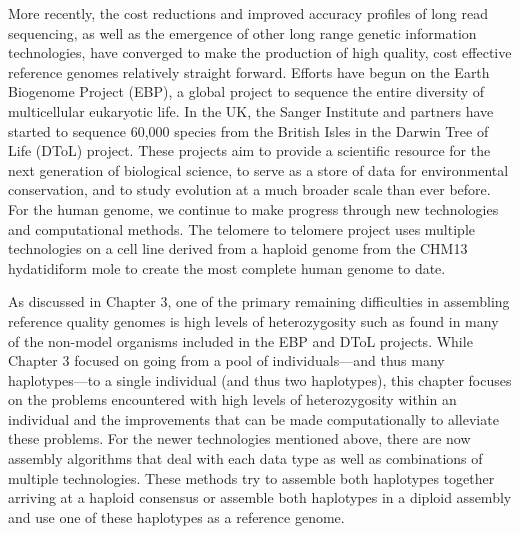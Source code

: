 \par{
More recently, the cost reductions and improved accuracy profiles\cite{ccs}\cite{HIFI} of long read sequencing\cite{pacbio}\cite{oxford},
as well as the emergence of other long range genetic information technologies\cite{10xlinked}\cite{HiC}\cite{bionano}, 
have converged to make the production of high quality, cost effective reference genomes relatively straight forward. Efforts have begun on the Earth Biogenome Project (EBP)\cite{EBGP}, a global project to sequence the entire diversity of multicellular eukaryotic life. In the UK, the Sanger Institute and partners have started to sequence 60,000 species from the British Isles in the Darwin Tree of Life (DToL) project. These projects aim to provide a scientific resource for the next generation of biological science, to serve as a store of data for environmental conservation, and to study evolution at a much broader scale than ever before. For the human genome, we continue to make progress through new technologies and computational methods\cite{Wenger2019}\cite{tobias1}\cite{eichler1}. The telomere to telomere project uses multiple technologies on a cell line derived from a haploid genome from the CHM13 hydatidiform mole to create the most complete human genome to date\cite{T2T2}\cite{T2T1}.
} 

\par{
As discussed in Chapter 3, one of the primary remaining difficulties in assembling reference quality genomes is high levels of heterozygosity such as found in many of the non-model organisms included in the EBP and DToL projects. While Chapter 3 focused on going from a pool of individuals---and thus many haplotypes---to a single individual (and thus two haplotypes), this chapter focuses on the problems encountered with high levels of heterozygosity within an individual and the improvements that can be made computationally to alleviate these problems.  
For the newer technologies mentioned above, there are now assembly algorithms that deal with each data type\cite{falcon}\cite{supernova}\cite{bionano_assembly} 
as well as combinations of multiple technologies\cite{genemyers}\cite{hybrid10x}\cite{hicscafffirst}\cite{hicassembly}. 
 These methods try to assemble both haplotypes together arriving at a haploid consensus\cite{watchtower}\cite{canu} 
 or assemble both haplotypes in a diploid assembly\cite{falconphase}\cite{supernova}\cite{hifiasm}\cite{dipasm} and use one of these haplotypes as a reference genome.
} 

